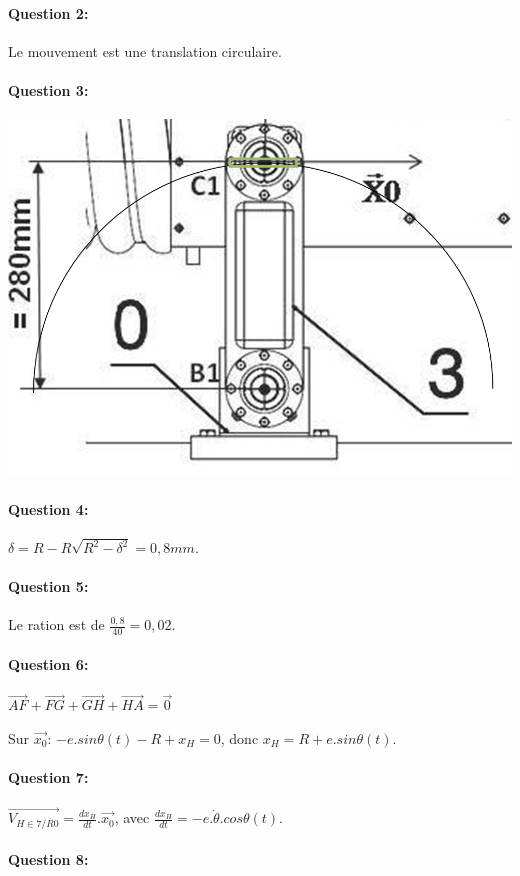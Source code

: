 \paragraph{Question 2:}

Le mouvement est une translation circulaire.

\paragraph{Question 3:}

\begin{center}
 \includegraphics[width=0.3\linewidth]{img/trajectoire}
\end{center}

\paragraph{Question 4:} $\delta=R-R\sqrt{R^2-\delta^2}=0,8mm$.

\paragraph{Question 5:} Le ration est de $\frac{0,8}{40}=0,02$.

\paragraph{Question 6:} $\overrightarrow{AF}+\overrightarrow{FG}+\overrightarrow{GH}+\overrightarrow{HA}=\overrightarrow{0}$

Sur $\overrightarrow{x_0}$: $-e.sin\theta(t)-R+x_H=0$, donc $x_H=R+e.sin\theta(t)$.

\paragraph{Question 7:} $\overrightarrow{V_{H\in7/R0}}=\frac{dx_H}{dt}.\overrightarrow{x_0}$, avec $\frac{dx_H}{dt}=-e.\dot{\theta}.cos\theta(t)$.

\paragraph{Question 8:} 

